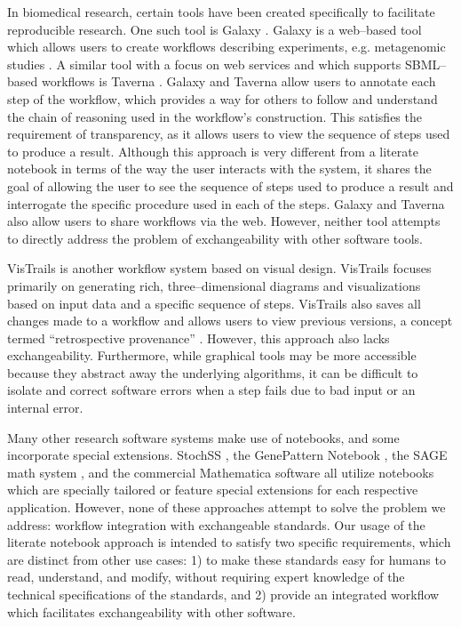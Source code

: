 \documentclass[10pt,letterpaper]{article}
\begin{document}
In biomedical research, certain tools have been created specifically to facilitate reproducible research. One such tool is Galaxy \cite{goecks2010galaxy}. Galaxy is a web--based tool which allows users to create workflows describing experiments, e.g. metagenomic studies \cite{pond2009windshield}. A similar tool with a focus on web services and which supports SBML--based workflows is Taverna \cite{oinn2004taverna}. Galaxy and Taverna allow users to annotate each step of the workflow, which provides a way for others to follow and understand the chain of reasoning used in the workflow's construction. This satisfies the requirement of transparency, as it allows users to view the sequence of steps used to produce a result. Although this approach is very different from a literate notebook in terms of the way the user interacts with the system, it shares the goal of allowing the user to see the sequence of steps used to produce a result and interrogate the specific procedure used in each of the steps. Galaxy and Taverna also allow users to share workflows via the web. However, neither tool attempts to directly address the problem of exchangeability with other software tools.

VisTrails \cite{callahan2006vistrails} is another workflow system based on visual design. VisTrails focuses primarily on generating rich, three--dimensional diagrams and visualizations based on input data and a specific sequence of steps. VisTrails also saves all changes made to a workflow and allows users to view previous versions, a concept termed ``retrospective provenance'' \cite{piccolo2016tools}.
However, this approach also lacks exchangeability. Furthermore, while graphical tools may be more accessible because they abstract away the underlying algorithms, it can be difficult to isolate and correct software errors when a step fails due to bad input or an internal error.

Many other research software systems make use of notebooks, and some incorporate special extensions. StochSS \cite{drawert2016stochastic}, the GenePattern Notebook \cite{reich2017genepattern}, the SAGE math system \cite{erocal2010sage}, and the commercial Mathematica software \cite{wolfram1996mathematica} all utilize notebooks which are specially tailored or feature special extensions for each respective application. However, none of these approaches attempt to solve the problem we address: workflow integration with exchangeable standards. Our usage of the literate notebook approach is intended to satisfy two specific requirements, which are distinct from other use cases: 1) to make these standards easy for humans to read, understand, and modify, without requiring expert knowledge of the technical specifications of the standards, and 2) provide an integrated workflow which facilitates exchangeability with other software.
\end{document}
